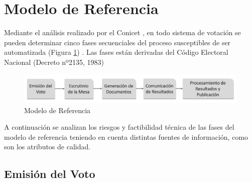 \section{Modelo de Referencia}

Mediante el análisis realizado por el Conicet \cite{conicet}, en todo sistema de votación se pueden determinar cinco fases secuenciales del proceso susceptibles de ser automatizada (Figura \ref{graf:modeloDeReferencia}) . Las fases están derivadas del Código Electoral Nacional (Decreto nº2135, 1983) \cite{decreto}

\begin{figure}[h!]
    \begin{center}
        \includegraphics[width=\textwidth]{img/modeloReferencia.png}
    \end{center}
  \caption{Modelo de Referencia}
  \label{graf:modeloDeReferencia}
\end{figure}

A continuación se analizan los riesgos y factibilidad técnica de las fases del modelo de referencia teniendo en cuenta distintas fuentes de información, como son los atributos de calidad.

\subsection{Emisión del Voto} 

